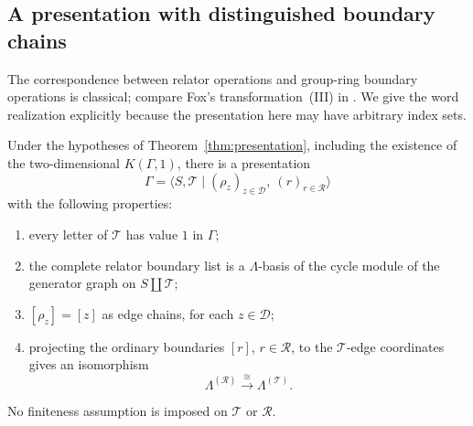 \subsection{A presentation with distinguished boundary chains}

The correspondence between relator operations and group-ring boundary
operations is classical; compare Fox's transformation~(III) in
\cite[Section~2]{Fox1954}. We give the word realization explicitly
because the presentation here may have arbitrary index sets.

\begin{lemma}\label{lem:aligned-presentation}
Under the hypotheses of Theorem~\ref{thm:presentation}, including the
existence of the two-dimensional $K(\Gamma,1)$, there is a presentation
\[
 \Gamma=\langle S,\mathcal T\mid
        (\rho_z)_{z\in\mathcal D},\ (r)_{r\in\mathcal R}\rangle
\]
with the following properties:
\begin{enumerate}
\item every letter of $\mathcal T$ has value $1$ in $\Gamma$;
\item the complete relator boundary list is a $\Lambda$-basis of the
cycle module of the generator graph on $S\amalg\mathcal T$;
\item $[\rho_z]=[z]$ as edge chains, for each $z\in\mathcal D$;
\item projecting the ordinary boundaries $[r]$, $r\in\mathcal R$, to
the $\mathcal T$-edge coordinates gives an isomorphism
\begin{equation}\label{eq:ordinary-projection}
 \Lambda^{(\mathcal R)}\xrightarrow{\ \cong\ }
 \Lambda^{(\mathcal T)}.
\end{equation}
\end{enumerate}
No finiteness assumption is imposed on $\mathcal T$ or $\mathcal R$.
\end{lemma}

